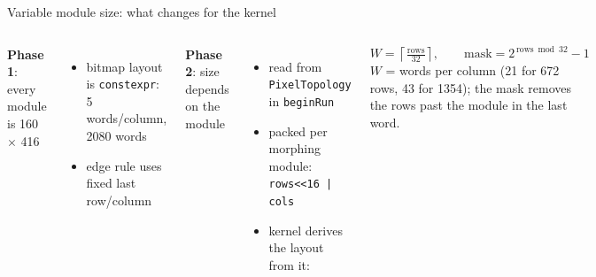 \documentclass[aspectratio=169,10pt,xcolor=table]{beamer}
\newcommand{\code}[1]{\texttt{\small #1}}
\begin{document}
\begin{frame}{Variable module size: what changes for the kernel}
  \begin{columns}[T]
    \textbf{Phase 1}: every module is 160 $\times$ 416
    \begin{itemize}
      \item bitmap layout is \code{constexpr}: 5 words/column, 2080 words
      \item edge rule uses fixed last row/column
    \end{itemize}
    \textbf{Phase 2}: size depends on the module
    \begin{itemize}
      \item read from \code{PixelTopology} in \code{beginRun}
      \item packed per morphing module: \code{rows<<16 | cols}
      \item kernel derives the layout from it:
    \end{itemize}
    \[
      W = \left\lceil \tfrac{\text{rows}}{32} \right\rceil, \qquad
      \text{mask} = 2^{\,\text{rows} \bmod 32} - 1
    \]
    {\small $W$ = words per column (21 for 672 rows, 43 for 1354); the mask removes the rows past the module in the last word.}
    \centering
  \end{columns}
\end{frame}

\end{document}
